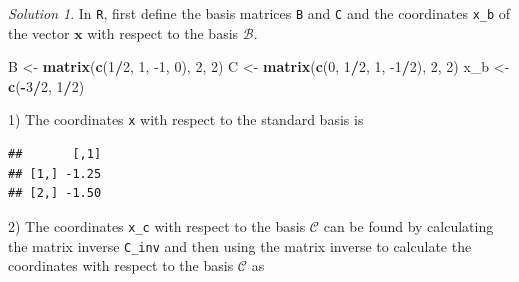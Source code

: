 \documentclass[
]{book}
\newenvironment{Shaded}{\begin{snugshade}}{\end{snugshade}}
\newcommand{\DecValTok}[1]{\textcolor[rgb]{0.00,0.00,0.81}{#1}}
\newcommand{\KeywordTok}[1]{\textcolor[rgb]{0.13,0.29,0.53}{\textbf{#1}}}
\newcommand{\NormalTok}[1]{#1}
\newcommand{\OperatorTok}[1]{\textcolor[rgb]{0.81,0.36,0.00}{\textbf{#1}}}
\newcommand{\StringTok}[1]{\textcolor[rgb]{0.31,0.60,0.02}{#1}}
\theoremstyle{definition}
\theoremstyle{definition}
\theoremstyle{definition}
\theoremstyle{definition}
\theoremstyle{remark}
\newtheorem*{solution}{Solution}
\begin{document}
\begin{solution}
In \texttt{R}, first define the basis matrices \texttt{B} and \texttt{C} and the coordinates \texttt{x\_b} of the vector \(\mathbf{x}\) with respect to the basis \(\mathcal{B}\).

\begin{Shaded}
\begin{Highlighting}[]
\NormalTok{B <-}\StringTok{ }\KeywordTok{matrix}\NormalTok{(}\KeywordTok{c}\NormalTok{(}\DecValTok{1}\OperatorTok{/}\DecValTok{2}\NormalTok{, }\DecValTok{1}\NormalTok{, }\DecValTok{-1}\NormalTok{, }\DecValTok{0}\NormalTok{), }\DecValTok{2}\NormalTok{, }\DecValTok{2}\NormalTok{)}
\NormalTok{C <-}\StringTok{ }\KeywordTok{matrix}\NormalTok{(}\KeywordTok{c}\NormalTok{(}\DecValTok{0}\NormalTok{, }\DecValTok{1}\OperatorTok{/}\DecValTok{2}\NormalTok{, }\DecValTok{1}\NormalTok{, }\DecValTok{-1}\OperatorTok{/}\DecValTok{2}\NormalTok{), }\DecValTok{2}\NormalTok{, }\DecValTok{2}\NormalTok{)}
\NormalTok{x_b <-}\StringTok{ }\KeywordTok{c}\NormalTok{(}\OperatorTok{-}\DecValTok{3}\OperatorTok{/}\DecValTok{2}\NormalTok{, }\DecValTok{1}\OperatorTok{/}\DecValTok{2}\NormalTok{)}
\end{Highlighting}
\end{Shaded}

1) The coordinates \texttt{x} with respect to the standard basis is

\begin{Shaded}
\end{Shaded}

\begin{verbatim}
##       [,1]
## [1,] -1.25
## [2,] -1.50
\end{verbatim}

2) The coordinates \texttt{x\_c} with respect to the basis \(\mathcal{C}\) can be found by calculating the matrix inverse \texttt{C\_inv} and then using the matrix inverse to calculate the coordinates with respect to the basis \(\mathcal{C}\) as

\begin{Shaded}
\end{Shaded}


\end{solution}
\end{document}
